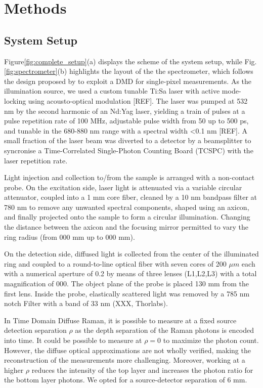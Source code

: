 \documentclass{osa-article}
\begin{document}
\section{Methods}
\subsection{System Setup}
Figure\ref{fig:complete_setup}(a) displays the scheme of the system setup, while Fig.\ref{fig:spectrometer}(b) highlights the layout of the the spectrometer, which follows the design proposed by\cite{Berto2017} to exploit a DMD for single-pixel measurements. As the illumination source, we used a custom tunable Ti:Sa laser with active mode-locking using acousto-optical modulation [REF]. The laser was pumped at 532 nm by the second harmonic of an Nd:Yag laser, yielding a train of pulses at a pulse repetition rate of 100 MHz, adjustable pulse width from 50 up to 500 ps, and tunable in the 680-880 nm range with a spectral width <0.1 nm [REF]. A small fraction of the laser beam was diverted to a detector by a beamsplitter to syncronise a Time-Correlated Single-Photon Counting Board (TCSPC) with the laser repetition rate.

Light injection and collection to/from the sample is arranged with a non-contact probe. On the excitation side, laser light is attenuated via a variable circular attenuator, coupled into a 1 mm core fiber, cleaned by a 10 nm bandpass filter at 780 nm to remove any unwanted spectral components, shaped using an axicon, and finally projected onto the sample to form a circular illumination. Changing the distance between the axicon and the focusing mirror permitted to vary the ring radius (from 000 mm up to 000 mm).

On the detection side, diffused light is collected from the center of the illuminated ring and coupled to a round-to-line optical fiber with seven cores of 200 $\mu m$ each with a numerical aperture of 0.2 by means of three lenses (L1,L2,L3) with a total magnification of 000. The object plane of the probe is placed 130 mm from the first lens. Inside the probe, elastically scattered light was removed by a 785 nm notch Filter with a band of 33 nm (XXX, Thorlabs).

In Time Domain Diffuse Raman, it is possible to measure at a fixed source detection separation $\rho$ as the depth separation of the Raman photons is encoded into time. It could be possible to measure at $\rho = 0$ to maximize the photon count. However, the diffuse optical approximations are not wholly verified, making the reconstruction of the measurements more challenging. Moreover, working at a higher $\rho$ reduces the intensity of the top layer and increases the photon ratio for the bottom layer photons. We opted for a source-detector separation of 6 mm.
\end{document}
